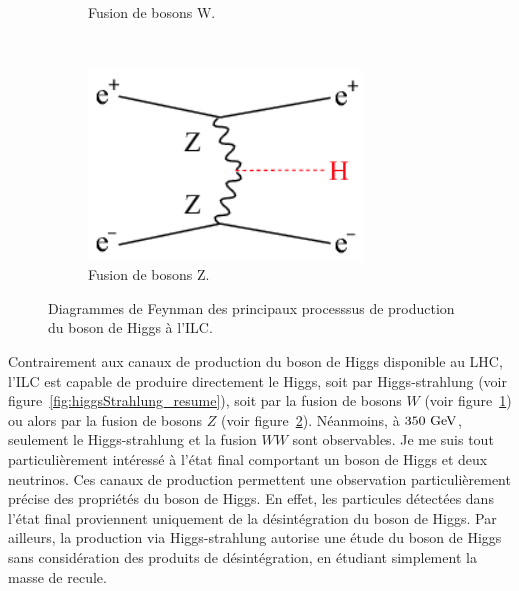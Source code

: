 \begin{figure}
\begin{subfigure}[t]{0.3\textwidth}
            \caption{Fusion de bosons W.}
            \label{fig:WW-fusion_resume}
        \end{subfigure}
        ~%
        \begin{subfigure}[t]{0.3\textwidth}
            \includegraphics[width = 0.8\textwidth]{Pictures/Higgs/HiggsProd_eeH.png}
            \caption{Fusion de bosons Z.}
            \label{fig:ZZ-fusion_resume}
        \end{subfigure}
        \caption{Diagrammes de Feynman des principaux processsus de production du boson de Higgs à l'ILC\cite{Asner2013}\cite{tian}.}
        \label{fig:higgsProduction_resume}
    \end{figure}    

  Contrairement aux canaux de production du boson de Higgs disponible au LHC, l'ILC est capable de produire directement le Higgs, soit par Higgs-strahlung (voir figure~\ref{fig:higgsStrahlung_resume}), soit par la fusion de bosons $W$ (voir figure~\ref{fig:WW-fusion_resume}) ou alors par la fusion de bosons $Z$ (voir figure~\ref{fig:ZZ-fusion_resume}).
  Néanmoins, à $350~\rm{GeV}$, seulement le Higgs-strahlung et la fusion $WW$ sont observables.
  Je me suis tout particulièrement intéressé à l'état final comportant un boson de Higgs et deux neutrinos.
  Ces canaux de production permettent une observation particulièrement précise des propriétés du boson de Higgs. 
  En effet, les particules détectées dans l'état final proviennent uniquement de la désintégration du boson de Higgs. 
  Par ailleurs, la production via Higgs-strahlung autorise une étude du boson de Higgs sans considération des produits de désintégration, en étudiant simplement la masse de recule.
  
